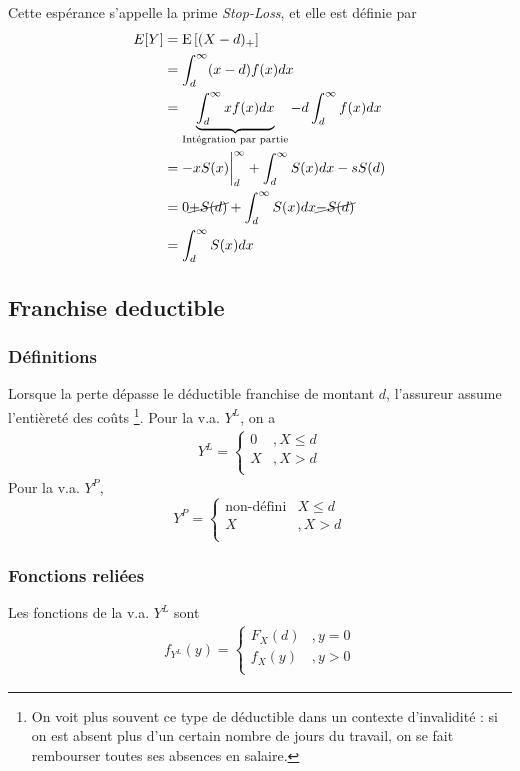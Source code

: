 \documentclass[12pt, french]{report}
\begin{document}
Cette espérance s'appelle la prime \textit{Stop-Loss}, et elle est définie par
\begin{align*}
E[Y]		& = \mathrm{E} \left[ (X-d)_+ \right] \\
	& = \int_{d}^{\infty} (x-d) f(x) dx \\
	& = \underbrace{\int_{d}^{\infty} x f(x) dx}_{\text{Intégration par partie}} - d \int_{d}^{\infty} f(x) dx \\
	& = -x S(x) \biggr \rvert_d^\infty + \int_{d}^{\infty} S(x) dx  - s S(d) \\
	& = 0  \cancel{+ S(d)} +  \int_{d}^{\infty} S(x) dx  \cancel{- S(d)} \\
	& = \int_{d}^{\infty} S(x) dx \\
\end{align*}

\subsection{Franchise deductible}

\subsubsection{Définitions}
Lorsque la perte dépasse le déductible franchise de montant $d$, l'assureur assume l'entièreté des coûts \footnote{On voit plus souvent ce type de déductible dans un contexte d'invalidité : si on est absent plus d'un certain nombre de jours du travail, on se fait rembourser toutes ses absences en salaire.}. Pour la v.a. $Y^L$, on a
\begin{align*}
Y^L = 
\begin{cases}
0		& , X \leq d \\
X		& , X > d \\
\end{cases}
\end{align*}
Pour la v.a. $Y^P$,
\begin{equation}
Y^P = 
\begin{cases}
\text{non-défini}	& X \leq d \\
X	& , X > d \\
\end{cases}
\end{equation}

\subsubsection{Fonctions reliées}
Les fonctions de la v.a. $Y^L$ sont
\begin{align*}
f_{Y^L}(y) = 
\begin{cases}
F_X(d)	& , y = 0 \\
f_X(y)	& , y > 0 \\
\end{cases}
\end{align*}
\end{document}
